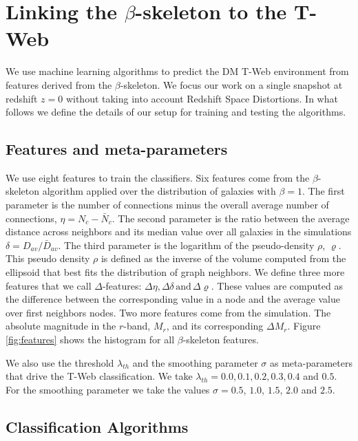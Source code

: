\documentclass[usenatbib]{mnras}
\begin{document}
\section{Linking the $\beta$-skeleton to the T-Web}\label{sec:link}

We use machine learning algorithms to predict the DM T-Web environment from features derived
from the $\beta$-skeleton.
We focus our work on a single snapshot at redshift $z=0$ without taking into
account Redshift Space Distortions.
In what follows we define the details of our setup for training and testing the algorithms.


\subsection{Features and meta-parameters}

We use eight features to train the classifiers.
Six features come from the $\beta$-skeleton algorithm applied over the distribution
of galaxies with $\beta=1$.
The first parameter is the number of connections minus the overall average number of
connections, $\eta = N_c - \bar{N}_c$. 
The second parameter is the ratio between the average distance across neighbors and its median
value over all galaxies in the simulations $\delta=D_{av}/\bar{D}_{av}$.
The third parameter is the logarithm of the pseudo-density $\rho$, $\varrho$. 
This pseudo density $\rho$ is defined as the inverse of the volume computed from the ellipsoid that best fits the distribution of graph neighbors.
We define three more features that we call $\Delta$-features: $\Delta\eta,\Delta\delta\,\text{and}\,\Delta\varrho$. 
These values are computed as the difference between the corresponding value in a node and the 
average value over first neighbors nodes.
Two more features come from the simulation. The absolute magnitude in the 
$r$-band, $M_r$, and its corresponding $\Delta M_r$.
Figure \ref{fig:features} shows the histogram for all $\beta$-skeleton features.



We also use the threshold $\lambda_{th}$ and the smoothing parameter $\sigma$ as
meta-parameters that drive the T-Web classification. 
We take $\lambda_{th}=0.0, 0.1, 0.2, 0.3, 0.4$ and $0.5$.
For the smoothing parameter we take the values $\sigma=0.5$, $1.0$, $1.5$, $2.0$ and $2.5$. 

\subsection{Classification Algorithms}
\end{document}
